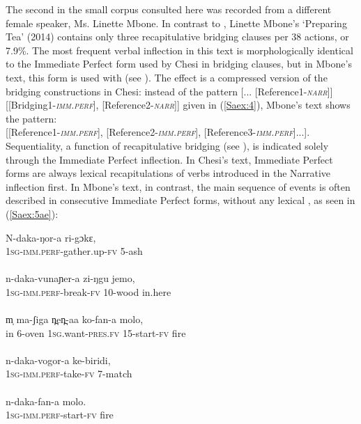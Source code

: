 \documentclass[output=paper]{LSP/langsci}
\begin{document}
The second  in the small corpus consulted here was recorded from a different female speaker, Ms. Linette Mbone. In contrast to \citet{Chesi2014}, Linette Mbone’s  `Preparing Tea' (2014) contains only three recapitulative bridging clauses per 38 actions, or 7.9\%. The most frequent verbal inflection in this text is morphologically identical to the Immediate Perfect form used by Chesi in bridging clauses, but in Mbone’s text, this form is used with   (see ). The effect is a compressed version of the bridging constructions in Chesi: instead of the pattern [... [Reference1-\textit{\textsc{narr}}]] [[Bridging1-\textit{\textsc{imm.perf}}], [Reference2-\textit{\textsc{narr}}]] given in (\ref{Saex:4}), Mbone’s text shows the pattern:\\ 
{[[Reference1-\textit{\textsc{imm.perf}}], [Reference2-\textit{\textsc{imm.perf}}], [Reference3-\textit{\textsc{imm.perf}}]...]}. Sequentiality, a function of recapitulative bridging (see ), is indicated solely through the Immediate Perfect inflection. In Chesi’s text, Immediate Perfect forms are always lexical recapitulations of verbs introduced in the Narrative inflection first. In Mbone’s text, in contrast, the main sequence of events is often described in consecutive Immediate Perfect forms, without any lexical , as seen in (\ref{Saex:5ae}):


\begin{exe}
\ex \label{Saex:5ae}
\begin{xlist}
\ex \label{Saex:5a}
\gll N-daka-ŋor-a       ri-gɔkɛ,\\
\textsc{1sg-imm.perf}-gather.up-\textsc{fv}  5-ash\\
\glt {}\\
\ex \label{Saex:5b}
\gll n-daka-vunaɲer-a     zi-ŋgu     jemo,\\
\textsc{1sg-imm.perf-}break-\textsc{fv}  10-wood  in.here\\
\glt {}\\
\ex \label{Saex:5c}
\gll m̩   ma-ʃiga   n̪en̪-aa       ko-fan-a   molo,\\
in  6-oven    \textsc{1sg.}want-\textsc{pres.fv}  15-start-\textsc{fv}  fire\\
\glt {}\\
\ex \label{Saex:5d}
\gll n-daka-vogor-a   ke-biridi,\\     	       
   \textsc{1sg-imm.perf-}take-\textsc{fv}  7-match\\
\glt {} \\
\ex \label{Saex:5e}
\gll n-daka-fan-a       molo.\\     	       
    \textsc{1sg-imm.perf-}start-\textsc{fv}  fire\\
\glt {} 
\end{xlist}
\end{exe}
\end{document}
